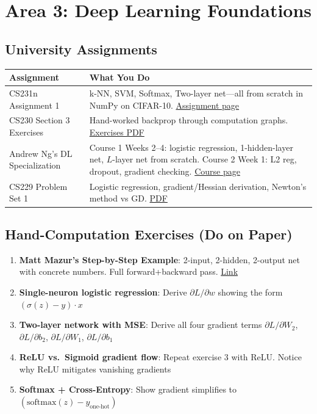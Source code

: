\documentclass[11pt,letterpaper]{article}
\begin{document}
\newpage
\section{Area 3: Deep Learning Foundations}

\subsection{University Assignments}

\begin{longtable}{@{}p{2in}p{3.8in}@{}}
\toprule
\textbf{Assignment} & \textbf{What You Do} \\
\midrule
\endhead
CS231n Assignment 1 & k-NN, SVM, Softmax, Two-layer net---all from scratch in NumPy on CIFAR-10. \href{https://cs231n.github.io/assignments2025/assignment1/}{Assignment page} \\
\addlinespace
CS230 Section 3 Exercises & Hand-worked backprop through computation graphs. \href{https://cs230.stanford.edu/winter2020/section3_exercises.pdf}{Exercises PDF} \\
\addlinespace
Andrew Ng's DL Specialization & Course 1 Weeks 2--4: logistic regression, 1-hidden-layer net, $L$-layer net from scratch. Course 2 Week 1: L2 reg, dropout, gradient checking. \href{https://www.coursera.org/specializations/deep-learning}{Course page} \\
\addlinespace
CS229 Problem Set 1 & Logistic regression, gradient/Hessian derivation, Newton's method vs GD. \href{https://cs229.stanford.edu/summer2020/ps1.pdf}{PDF} \\
\bottomrule
\end{longtable}

\subsection{Hand-Computation Exercises (Do on Paper)}

\begin{enumerate}[nosep]
    \item \textbf{Matt Mazur's Step-by-Step Example}: 2-input, 2-hidden, 2-output net with concrete numbers. Full forward+backward pass. \href{https://mattmazur.com/2015/03/17/a-step-by-step-backpropagation-example/}{Link}
    \item \textbf{Single-neuron logistic regression}: Derive $\partial L / \partial w$ showing the form $(\sigma(z) - y) \cdot x$
    \item \textbf{Two-layer network with MSE}: Derive all four gradient terms $\partial L / \partial W_2$, $\partial L / \partial b_2$, $\partial L / \partial W_1$, $\partial L / \partial b_1$
    \item \textbf{ReLU vs.\ Sigmoid gradient flow}: Repeat exercise 3 with ReLU. Notice why ReLU mitigates vanishing gradients
    \item \textbf{Softmax + Cross-Entropy}: Show gradient simplifies to $(\text{softmax}(z) - y_{\text{one-hot}})$
\end{enumerate}
\end{document}
